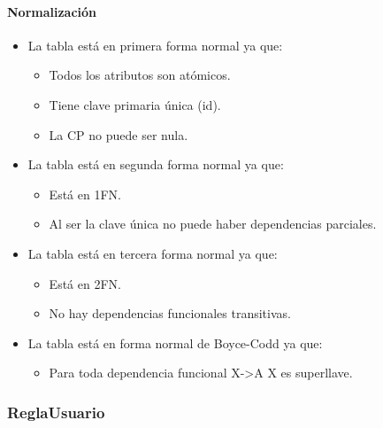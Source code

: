 \documentclass[12pt,a4paperpaper,]{report}
\providecommand{\tightlist}{%
  \setlength{\itemsep}{0pt}\setlength{\parskip}{0pt}}
\let\oldparagraph\paragraph
\renewcommand{\paragraph}[1]{\oldparagraph{#1}\mbox{}}
\begin{document}
\paragraph{Normalización}\label{normalizaciuxf3n-10}

\begin{itemize}
\tightlist
\item
  La tabla está en primera forma normal ya que:

  \begin{itemize}
  \tightlist
  \item
    Todos los atributos son atómicos.
  \item
    Tiene clave primaria única (id).
  \item
    La CP no puede ser nula.
  \end{itemize}
\item
  La tabla está en segunda forma normal ya que:

  \begin{itemize}
  \tightlist
  \item
    Está en 1FN.
  \item
    Al ser la clave única no puede haber dependencias parciales.
  \end{itemize}
\item
  La tabla está en tercera forma normal ya que:

  \begin{itemize}
  \tightlist
  \item
    Está en 2FN.
  \item
    No hay dependencias funcionales transitivas.
  \end{itemize}
\item
  La tabla está en forma normal de Boyce-Codd ya que:

  \begin{itemize}
  \tightlist
  \item
    Para toda dependencia funcional X-\textgreater{}A X es superllave.
  \end{itemize}
\end{itemize}

\subsubsection{ReglaUsuario}\label{reglausuario}
\end{document}

